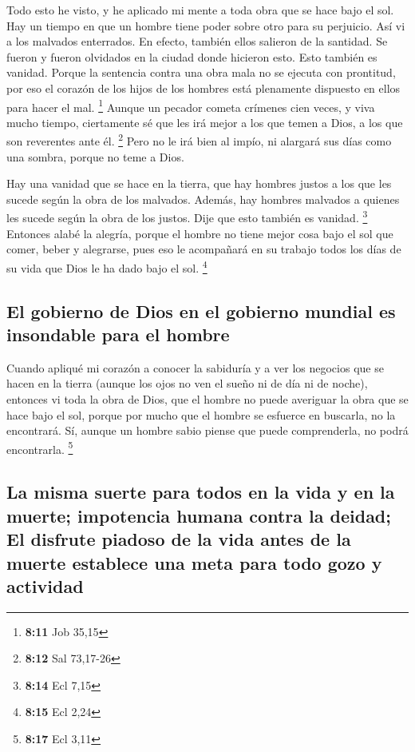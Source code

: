  Todo esto he visto, y he aplicado mi mente a toda obra
que se hace bajo el sol. Hay un tiempo en que un hombre tiene poder
sobre otro para su perjuicio.  Así vi a los malvados
enterrados. En efecto, también ellos salieron de la santidad. Se fueron
y fueron olvidados en la ciudad donde hicieron esto. Esto también es
vanidad.  Porque la sentencia contra una obra mala no se
ejecuta con prontitud, por eso el corazón de los hijos de los hombres
está plenamente dispuesto en ellos para hacer el mal. \footnote{\textbf{8:11}
  Job 35,15}  Aunque un pecador cometa crímenes cien
veces, y viva mucho tiempo, ciertamente sé que les irá mejor a los que
temen a Dios, a los que son reverentes ante él. \footnote{\textbf{8:12}
  Sal 73,17-26}  Pero no le irá bien al impío, ni
alargará sus días como una sombra, porque no teme a Dios.

 Hay una vanidad que se hace en la tierra, que hay
hombres justos a los que les sucede según la obra de los malvados.
Además, hay hombres malvados a quienes les sucede según la obra de los
justos. Dije que esto también es vanidad. \footnote{\textbf{8:14} Ecl
  7,15}  Entonces alabé la alegría, porque el hombre no
tiene mejor cosa bajo el sol que comer, beber y alegrarse, pues eso le
acompañará en su trabajo todos los días de su vida que Dios le ha dado
bajo el sol. \footnote{\textbf{8:15} Ecl 2,24}

\hypertarget{el-gobierno-de-dios-en-el-gobierno-mundial-es-insondable-para-el-hombre}{%
\subsection{El gobierno de Dios en el gobierno mundial es insondable
para el
hombre}\label{el-gobierno-de-dios-en-el-gobierno-mundial-es-insondable-para-el-hombre}}

 Cuando apliqué mi corazón a conocer la sabiduría y a ver
los negocios que se hacen en la tierra (aunque los ojos no ven el sueño
ni de día ni de noche),  entonces vi toda la obra de
Dios, que el hombre no puede averiguar la obra que se hace bajo el sol,
porque por mucho que el hombre se esfuerce en buscarla, no la
encontrará. Sí, aunque un hombre sabio piense que puede comprenderla, no
podrá encontrarla. \footnote{\textbf{8:17} Ecl 3,11}

\hypertarget{la-misma-suerte-para-todos-en-la-vida-y-en-la-muerte-impotencia-humana-contra-la-deidad-el-disfrute-piadoso-de-la-vida-antes-de-la-muerte-establece-una-meta-para-todo-gozo-y-actividad}{%
\subsection{La misma suerte para todos en la vida y en la muerte;
impotencia humana contra la deidad; El disfrute piadoso de la vida antes
de la muerte establece una meta para todo gozo y
actividad}\label{la-misma-suerte-para-todos-en-la-vida-y-en-la-muerte-impotencia-humana-contra-la-deidad-el-disfrute-piadoso-de-la-vida-antes-de-la-muerte-establece-una-meta-para-todo-gozo-y-actividad}}

